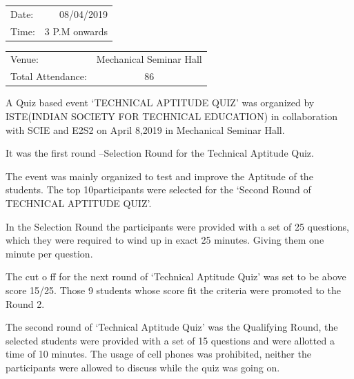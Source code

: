 \documentclass[12pt, a4 paper]{article}
\begin{document}
\begin{center}
\begin{multicols}{2}
\begin{tabular}{l r}
Date: & 08/04/2019\\ %
Time: & 3 P.M onwards \\ %
\end{tabular}
\columnbreak
\begin{tabular}{l c}
Venue: & Mechanical Seminar Hall \\ %
Total Attendance: & 86\\ %
\end{tabular}
\end{multicols}

\bigskip

\begin{large}
\justify
A Quiz based event ‘TECHNICAL APTITUDE QUIZ’ was organized by ISTE(INDIAN SOCIETY FOR TECHNICAL EDUCATION) in collaboration with SCIE and E2S2 on April 8,2019 in Mechanical Seminar Hall. 

\justify
It was the first round –Selection Round for the Technical Aptitude Quiz.

\justify
The event was mainly organized to test and improve the Aptitude of the students. The top 10participants were selected for the ‘Second Round of TECHNICAL APTITUDE QUIZ’. 

\justify
In the Selection Round the participants were provided with a set of 25 questions, which they were required to wind up in exact 25 minutes. Giving them one minute per question.
 
\newpage
\justify
The cut o ff for the next round of ‘Technical Aptitude Quiz’ was set to be above score 15/25. Those 9 students whose score fit the criteria were promoted to the Round 2.


\justify
The second round of ‘Technical Aptitude Quiz’ was the Qualifying Round, the selected students were provided with a set of 15 questions and were allotted a time of 10 minutes. The usage of cell phones was prohibited, neither the participants were allowed to discuss while the quiz was going on.
 

\end{large} 
\end{center}
\end{document}
